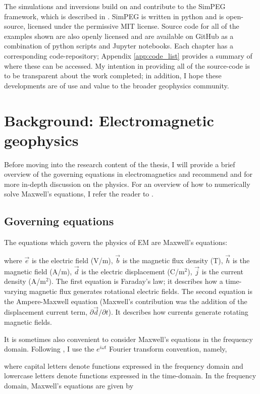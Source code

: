 The simulations and inversions build on and contribute to the SimPEG framework, which is described in \cite{Cockett2015, Heagy2017, Cockett2017}. SimPEG is written in python and is open-source, licensed under the permissive MIT license. Source code for all of the examples shown are also openly licensed and are available on GitHub as a combination of python scripts and Jupyter notebooks. Each chapter has a corresponding code-repository; Appendix \ref{app:code_list} provides a summary of where these can be accessed. My intention in providing all of the source-code is to be transparent about the work completed; in addition, I hope these developments are of use and value to the broader geophysics community.
\section{Background: Electromagnetic geophysics}
\label{sec:background-em}
Before moving into the research content of the thesis, I will provide a brief overview of the governing equations in electromagnetics and recommend \cite{Ward1988} and \cite{emgeosci} for more in-depth discussion on the physics. For an overview of how to numerically solve Maxwell's equations, I refer the reader to \cite{Haber2014}.
\subsection{Governing equations}
The equations which govern the physics of EM are Maxwell's equations:

where $\vec{e}$ is the electric field (V/m), $\vec{b}$ is the magnetic flux density (T), $\vec{h}$ is the magnetic field (A/m), $\vec{d}$ is the electric displacement (C/m$^2$), $\vec{j}$ is the current density (A/m$^2$). The first equation is Faraday's law; it describes how a time-varying magnetic flux generates rotational electric fields. The second equation is the Ampere-Maxwell equation (Maxwell's contribution was the addition of the displacement current term, $\partial \vec{d} / \partial t$). It describes how currents generate rotating magnetic fields.

It is sometimes also convenient to consider Maxwell's equations in the frequency domain. Following \cite{Ward1988}, I use the $e^{i\omega t}$ Fourier transform convention, namely,

where capital letters denote functions expressed in the frequency domain and lowercase letters denote functions expressed in the time-domain.
In the frequency domain, Maxwell's equations are given by


